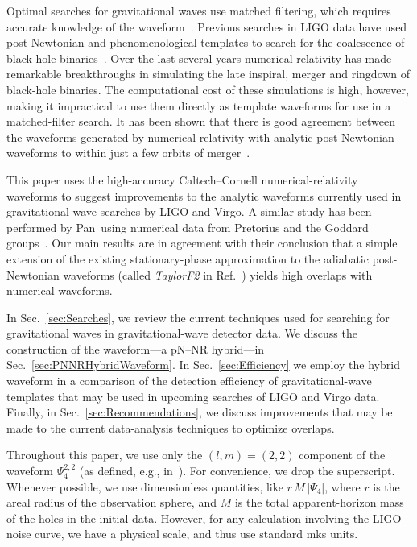 Optimal searches for gravitational waves use matched filtering, which
requires accurate knowledge of the waveform~\cite{thorne.k:1987}.
Previous searches in LIGO data have used post-Newtonian and
phenomenological templates to search for the coalescence of black-hole
binaries~\cite{Abbott:2005pf,Abbott:2007xi,Abbott:2008}. Over the last
several years numerical relativity has made remarkable breakthroughs
in simulating the late inspiral, merger and ringdown of black-hole
binaries. The computational cost of these simulations is high,
however, making it impractical to use them directly as template
waveforms for use in a matched-filter search. It has been shown that
there is good agreement between the waveforms generated by numerical
relativity with analytic post-Newtonian waveforms to within just a few
orbits of merger~\cite{Buonanno-Cook-Pretorius:2007, Baker2006d,
  Pan2007, Buonanno2007, Hannam2007, Boyle2007, Gopakumar:2007vh,
  Hannam2007c, Boyle2008a, Mroue2008, Hinder2008b}.

This paper uses the high-accuracy Caltech--Cornell
numerical-relativity waveforms to suggest improvements to the analytic
waveforms currently used in gravitational-wave searches by LIGO and
Virgo.  A similar study has been performed by Pan~\etal using
numerical data from Pretorius and the Goddard groups~\cite{Pan2007}.
Our main results are in agreement with their conclusion that a simple
extension of the existing stationary-phase approximation to the
adiabatic post-Newtonian waveforms (called \textit{TaylorF2} in
Ref.~\cite{Damour2001}) yields high overlaps with numerical waveforms.

In Sec.~\ref{sec:Searches}, we review the current techniques used for
searching for gravitational waves in gravitational-wave detector data.
We discuss the construction of the waveform---a pN--NR hybrid---in
Sec.~\ref{sec:PNNRHybridWaveform}.  In Sec.~\ref{sec:Efficiency} we
employ the hybrid waveform in a comparison of the detection efficiency
of gravitational-wave templates that may be used in upcoming searches
of LIGO and Virgo data.  Finally, in Sec.~\ref{sec:Recommendations},
we discuss improvements that may be made to the current data-analysis
techniques to optimize overlaps.

Throughout this paper, we use only the $(l,m)=(2,2)$ component of the
waveform $\Psi_{4}^{2,2}$ (as defined, e.g., in~\cite{Boyle2008a}).
For convenience, we drop the superscript.  Whenever possible, we use
dimensionless quantities, like $r\,M\,\lvert \Psi_{4} \rvert$, where
$r$ is the areal radius of the observation sphere, and $M$ is the
total apparent-horizon mass of the holes in the initial data.
However, for any calculation involving the LIGO noise curve, we have a
physical scale, and thus use standard mks units.

